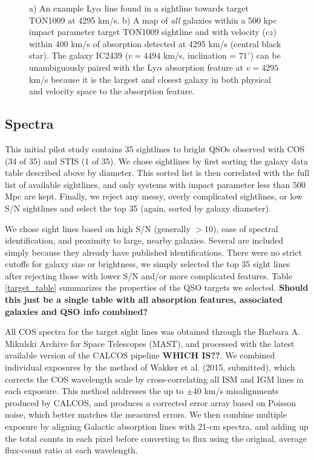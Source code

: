 \documentclass[iop]{emulateapj-rtx4}
\begin{document}
\begin{figure}[h!]
  \caption{\small{a) An example Ly$\alpha$ line found in a sightline towards target TON1009 at 4295 km/s. b) A map of \textit{all} galaxies within a 500 kpc impact parameter target TON1009 sightline and with velocity ($cz$) within 400 km/s of absorption detected at 4295 km/s (central black star). The galaxy IC2439 ($v=4494$ km/s, inclination = $71^{\circ}$) can be unambiguously paired with the Ly$\alpha$ absorption feature at $v=4295$ km/s because it is the largest and closest galaxy in both physical and velocity space to the absorption feature.}}
\vspace{5pt}
\end{figure}



\subsection{Spectra}

This initial pilot study contains 35 sightlines to bright QSOs observed with COS (34 of 35) and STIS (1 of 35). We chose sightlines by first sorting the galaxy data table described above by diameter. This sorted list is then correlated with the full list of available sightlines, and only systems with impact parameter less than 500 Mpc are kept. Finally, we reject any messy, overly complicated sightlines, or low S/N sightlines and select the top 35 (again, sorted by galaxy diameter). 

We chose sight lines based on high S/N (generally $>$10), ease of spectral identification, and proximity to large, nearby galaxies. Several are included simply because they already have published identifications. There were no strict cutoffs for galaxy size or brightness, we simply selected the top 35 sight lines after rejecting those with lower S/N and/or more complicated features. Table \ref{target_table} summarizes the properties of the QSO targets we selected. \textbf{Should this just be a single table with all absorption features, associated galaxies and QSO info combined?}

All COS spectra for the target sight lines was obtained through the Barbara A. Mikulski Archive for Space Telescopes (MAST), and processed with the latest available version of the CALCOS pipeline \textbf{WHICH IS??}. We combined individual exposures by the method of Wakker et al. (2015, submitted), which corrects the COS wavelength scale by cross-correlating all ISM and IGM lines in each exposure. This method addresses the up to $\pm40$ km/s misalignments produced by CALCOS, and produces a corrected error array based on Poisson noise, which better matches the measured errors. We then combine multiple exposure by aligning Galactic absorption lines with 21-cm spectra, and adding up the total counts in each pixel before converting to flux using the original, average flux-count ratio at each wavelength.
\end{document}
